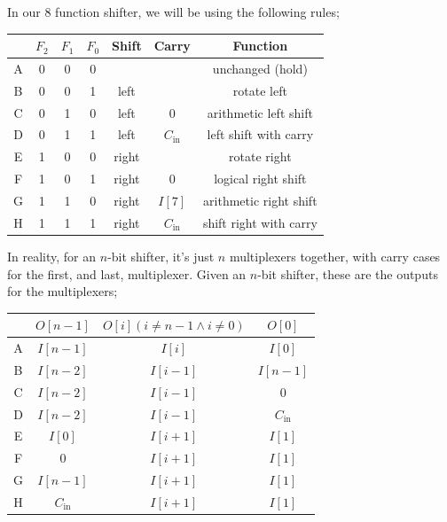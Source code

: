 \documentclass[a4paper, 12pt]{article}
\begin{document}
            In our 8 function shifter, we will be using the following rules;
            \begin{center}
                \begin{tabular}{c||c|c|c||c|c||c}
                    & $F_2$ & $F_1$ & $F_0$ & Shift & Carry & Function \\
                    \hline
                    A & 0 & 0 & 0 & & & unchanged (hold) \\
                    B & 0 & 0 & 1 & left & & rotate left \\
                    C & 0 & 1 & 0 & left & 0 & arithmetic left shift \\
                    D & 0 & 1 & 1 & left & $C_\text{in}$ & left shift with carry \\
                    E & 1 & 0 & 0 & right & & rotate right \\
                    F & 1 & 0 & 1 & right & 0 & logical right shift \\
                    G & 1 & 1 & 0 & right & $I[7]$ & arithmetic right shift \\
                    H & 1 & 1 & 1 & right & $C_\text{in}$ & shift right with carry
                \end{tabular}
            \end{center}
            In reality, for an $n$-bit shifter, it's just $n$ multiplexers together, with carry cases for the first, and last, multiplexer. Given an $n$-bit shifter, these are the outputs for the multiplexers;
            \begin{center}
                \begin{tabular}{c||c|c|c}
                    & $O[n-1]$ & $O[i] (i \neq n-1 \land i \neq 0)$ & $O[0]$ \\
                    \hline
                    A & $I[n-1]$ & $I[i]$ & $I[0]$ \\
                    B & $I[n-2]$ & $I[i-1]$ & $I[n-1]$ \\
                    C & $I[n-2]$ & $I[i-1]$ & $0$ \\
                    D & $I[n-2]$ & $I[i-1]$ & $C_\text{in}$ \\
                    E & $I[0]$ & $I[i+1]$ & $I[1]$ \\
                    F & 0 & $I[i+1]$ & $I[1]$ \\
                    G & $I[n-1]$ & $I[i+1]$ & $I[1]$ \\
                    H & $C_\text{in}$ & $I[i+1]$ & $I[1]$
                \end{tabular}
            \end{center}
\end{document}

